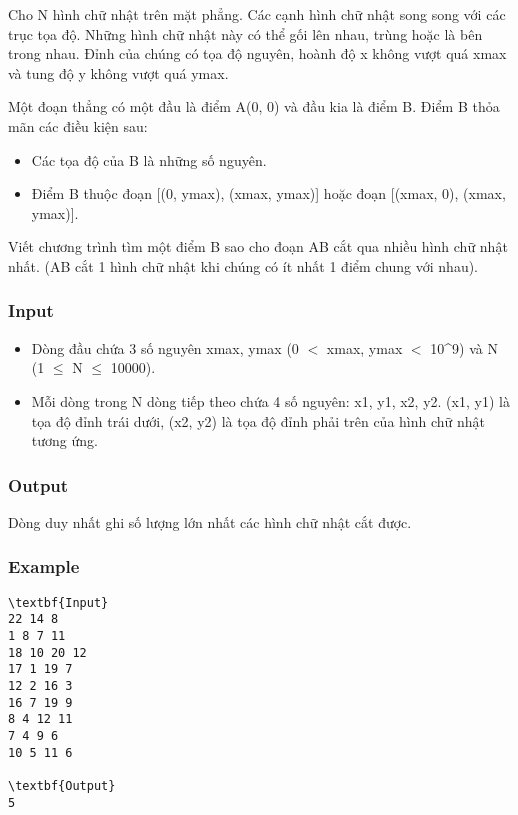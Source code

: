 

Cho N hình chữ nhật trên mặt phẳng. Các cạnh hình chữ nhật song song với các trục tọa độ. Những hình chữ nhật này có thể gối lên nhau, trùng hoặc là bên trong nhau. Đỉnh của chúng có tọa độ nguyên, hoành độ x không vượt quá xmax và tung độ y không vượt quá ymax.


Một đoạn thẳng có một đầu là điểm A(0, 0) và đầu kia là điểm B. Điểm B thỏa mãn các điều kiện sau:
\begin{itemize}
	\item Các tọa độ của B là những số nguyên.
	\item Điểm B thuộc đoạn [(0, ymax), (xmax, ymax)] hoặc đoạn [(xmax, 0), (xmax, ymax)].
\end{itemize}

Viết chương trình tìm một điểm B sao cho đoạn AB cắt qua nhiều hình chữ nhật nhất. (AB cắt 1 hình chữ nhật khi chúng có ít nhất 1 điểm chung với nhau).

\subsubsection{Input}
\begin{itemize}
	\item Dòng đầu chứa 3 số nguyên xmax, ymax (0 $<$ xmax, ymax $<$ 10^9) và N (1  $\le$  N  $\le$  10000).
	\item Mỗi dòng trong N dòng tiếp theo chứa 4 số nguyên: x1, y1, x2, y2. (x1, y1) là tọa độ đỉnh trái dưới, (x2, y2) là tọa độ đỉnh phải trên của hình chữ nhật tương ứng.
\end{itemize}

\subsubsection{Output}

Dòng duy nhất ghi số lượng lớn nhất các hình chữ nhật cắt được.

\subsubsection{Example}
\begin{verbatim}
\textbf{Input}
22 14 8
1 8 7 11
18 10 20 12
17 1 19 7
12 2 16 3
16 7 19 9
8 4 12 11
7 4 9 6
10 5 11 6

\textbf{Output}
5
\end{verbatim}
